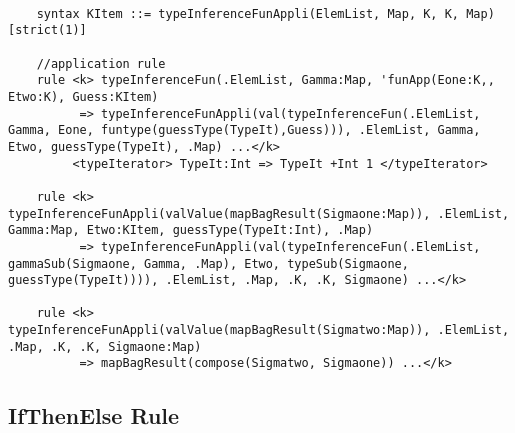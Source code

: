 \begin{lstlisting}

    syntax KItem ::= typeInferenceFunAppli(ElemList, Map, K, K, Map) [strict(1)]

    //application rule
    rule <k> typeInferenceFun(.ElemList, Gamma:Map, 'funApp(Eone:K,, Etwo:K), Guess:KItem)
          => typeInferenceFunAppli(val(typeInferenceFun(.ElemList, Gamma, Eone, funtype(guessType(TypeIt),Guess))), .ElemList, Gamma, Etwo, guessType(TypeIt), .Map) ...</k>
         <typeIterator> TypeIt:Int => TypeIt +Int 1 </typeIterator>

    rule <k> typeInferenceFunAppli(valValue(mapBagResult(Sigmaone:Map)), .ElemList, Gamma:Map, Etwo:KItem, guessType(TypeIt:Int), .Map)
          => typeInferenceFunAppli(val(typeInferenceFun(.ElemList, gammaSub(Sigmaone, Gamma, .Map), Etwo, typeSub(Sigmaone, guessType(TypeIt)))), .ElemList, .Map, .K, .K, Sigmaone) ...</k>

    rule <k> typeInferenceFunAppli(valValue(mapBagResult(Sigmatwo:Map)), .ElemList, .Map, .K, .K, Sigmaone:Map)
          => mapBagResult(compose(Sigmatwo, Sigmaone)) ...</k>

\end{lstlisting}

\subsection{IfThenElse Rule}

\begin{prooftree}
\end{prooftree}

